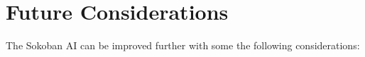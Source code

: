 \documentclass{article}
\begin{document}




\newpage

\section{Future Considerations}
The Sokoban AI can be improved further with some the following considerations:
\end{document}
